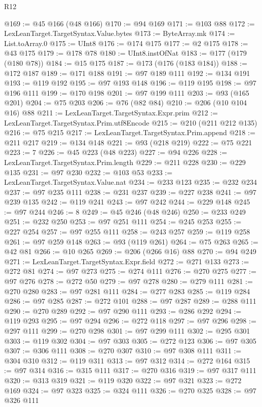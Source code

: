 \begin{lexlean}{R12}
\begin{coremodule}
{{{{{{{{{{{{{{{{{{{{{{{{{{{{{{{{{{{{{{{{{{{{{{{{{{{{{{{{{{{{{{{{{{{{{{{{{{{{{{{{{{@169 := @45 @166 (@48 @166)
@170 := @94 @169
@171 := @103 @88
@172 := LexLeanTarget.TargetSyntax.Value.bytes
@173 := ByteArray.mk
@174 := List.toArray.{0}
@175 := UInt8
@176 := @174 @175
@177 := @2 @175
@178 := @43 @175
@179 := @178 @78
@180 := UInt8.instOfNat
@183 := @177 (@179 (@180 @78))
@184 := @15 @175
@187 := @173 (@176 (@183 @184))
@188 := @172 @187
@189 := @171 @188
@191 := @97 @189 @111
@192 := @134 @191
@193 := @119 @192
@195 := @97 @193 @148
@196 := @119 @195
@198 := @97 @196 @111
@199 := @170 @198
@201 := @97 @199 @111
@203 := @93 (@165 @201)
@204 := @75 @203
@206 := @76 (@82 @84)
@210 := @206 (@10 @104 @16) @88
@211 := LexLeanTarget.TargetSyntax.Expr.prim
@212 := LexLeanTarget.TargetSyntax.Prim.utf8Encode
@215 := @210 (@211 @212 @135)
@216 := @75 @215
@217 := LexLeanTarget.TargetSyntax.Prim.append
@218 := @211 @217
@219 := @134 @148
@221 := @93 (@218 @219)
@222 := @75 @221
@223 := 7
@226 := @45 @223 (@48 @223)
@227 := @94 @226
@228 := LexLeanTarget.TargetSyntax.Prim.length
@229 := @211 @228
@230 := @229 @135
@231 := @97 @230
@232 := @103 @53
@233 := LexLeanTarget.TargetSyntax.Value.nat
@234 := @233 @123
@235 := @232 @234
@237 := @97 @235 @111
@238 := @231 @237
@239 := @227 @238
@241 := @97 @239 @135
@242 := @119 @241
@243 := @97 @242
@244 := @229 @148
@245 := @97 @244
@246 := 8
@249 := @45 @246 (@48 @246)
@250 := @233 @249
@251 := @232 @250
@253 := @97 @251 @111
@254 := @245 @253
@255 := @227 @254
@257 := @97 @255 @111
@258 := @243 @257
@259 := @119 @258
@261 := @97 @259 @148
@263 := @93 (@119 @261)
@264 := @75 @263
@265 := @42 @81
@266 := @10 @265
@269 := @206 (@266 @16) @88
@270 := @94 @249
@271 := LexLeanTarget.TargetSyntax.Expr.field
@272 := @271 @133
@273 := @272 @81
@274 := @97 @273
@275 := @274 @111
@276 := @270 @275
@277 := @97 @276
@278 := @272 @50
@279 := @97 @278
@280 := @279 @111
@281 := @270 @280
@283 := @97 @281 @111
@284 := @277 @283
@285 := @119 @284
@286 := @97 @285
@287 := @272 @101
@288 := @97 @287
@289 := @288 @111
@290 := @270 @289
@292 := @97 @290 @111
@293 := @286 @292
@294 := @119 @293
@295 := @97 @294
@296 := @272 @118
@297 := @97 @296
@298 := @297 @111
@299 := @270 @298
@301 := @97 @299 @111
@302 := @295 @301
@303 := @119 @302
@304 := @97 @303
@305 := @272 @123
@306 := @97 @305
@307 := @306 @111
@308 := @270 @307
@310 := @97 @308 @111
@311 := @304 @310
@312 := @119 @311
@313 := @97 @312
@314 := @272 @164
@315 := @97 @314
@316 := @315 @111
@317 := @270 @316
@319 := @97 @317 @111
@320 := @313 @319
@321 := @119 @320
@322 := @97 @321
@323 := @272 @169
@324 := @97 @323
@325 := @324 @111
@326 := @270 @325
@328 := @97 @326 @111
}}}}}}}}}}}}}}}}}}}}}}}}}}}}}}}}}}}}}}}}}}}}}}}}}}}}}}}}}}}}}}}}}}}}}}}}}}}}}}}}}}
\end{coremodule}
\end{lexlean}
